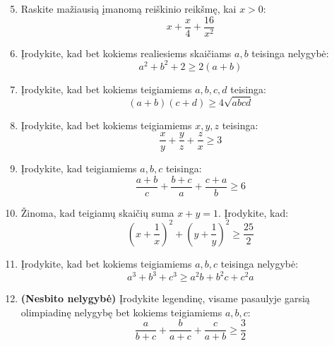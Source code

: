 \documentclass[11pt,a4paper]{scrartcl}
\begin{document}
\begin{enumerate}
    \setcounter{enumi}{4}

    \item Raskite mažiausią įmanomą reiškinio reikšmę, kai $x > 0$:
    $$ x + \frac{x}{4} + \frac{16}{x^2} $$

    \item Įrodykite, kad bet kokiems realiesiems skaičiams $a, b$ teisinga nelygybė:
    $$ a^2 + b^2 + 2 \ge 2(a + b) $$

    \item Įrodykite, kad bet kokiems teigiamiems $a, b, c, d$ teisinga:
    $$ (a+b)(c+d) \ge 4\sqrt{abcd} $$

    \item Įrodykite, kad bet kokiems teigiamiems $x, y, z$ teisinga:
    $$ \frac{x}{y} + \frac{y}{z} + \frac{z}{x} \ge 3 $$
\end{enumerate}

\begin{enumerate}
    \setcounter{enumi}{8}

    \item Įrodykite, kad teigiamiems $a, b, c$ teisinga:
    $$ \frac{a+b}{c} + \frac{b+c}{a} + \frac{c+a}{b} \ge 6 $$

    \item Žinoma, kad teigiamų skaičių suma $x + y = 1$. Įrodykite, kad:
    $$ \left(x + \frac{1}{x}\right)^2 + \left(y + \frac{1}{y}\right)^2 \ge \frac{25}{2} $$

    \item Įrodykite, kad bet kokiems teigiamiems $a, b, c$ teisinga nelygybė:
    $$ a^3 + b^3 + c^3 \ge a^2b + b^2c + c^2a $$

    \item \textbf{(Nesbito nelygybė)} Įrodykite legendinę, visame pasaulyje garsią olimpiadinę nelygybę bet kokiems teigiamiems $a, b, c$:
    $$ \frac{a}{b+c} + \frac{b}{a+c} + \frac{c}{a+b} \ge \frac{3}{2} $$
\end{enumerate}


\end{document}
